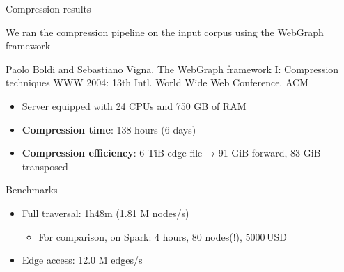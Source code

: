 \documentclass[aspectratio=169,xcolor=table]{beamer}
\begin{document}
    \begin{frame}{Compression results}

        \begin{block}{}
            We ran the compression pipeline on the input corpus using the WebGraph
            framework
            \begin{thebibliography}{}
                \footnotesize
                 Paolo Boldi and Sebastiano Vigna.
                \newblock The WebGraph framework I: Compression techniques
                \newblock WWW 2004: 13th Intl. World Wide Web Conference. ACM
            \end{thebibliography}
        \end{block}

        \begin{block}{}
            \begin{itemize}
                \item Server equipped with 24 CPUs and 750 GB of RAM
                \item \textbf{Compression time}: 138 hours (6 days)
                \item \textbf{Compression efficiency}: 6 TiB edge file → 91 GiB
                    forward, 83 GiB transposed
            \end{itemize}
        \end{block}

        \begin{block}{Benchmarks}
            \begin{itemize}
                \item Full traversal: 1h48m (1.81 M nodes/s)
                    \begin{itemize}
                        \item For comparison, on Spark: 4 hours, 80 nodes(!),
                            5000\,USD
                    \end{itemize}
                \item Edge access: 12.0 M edges/s
            \end{itemize}
        \end{block}

    \end{frame}
\end{document}
